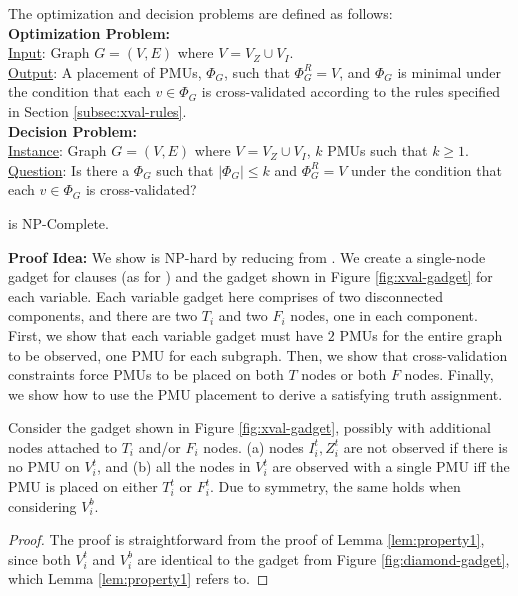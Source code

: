 The \xval optimization and decision problems are defined as follows:
\\
{\bf \xval Optimization Problem:} \\
	\indent \underline{Input}: Graph $G=(V,E)$ where $V=V_Z \cup V_I$. \\
	\indent \underline{Output}: A placement of PMUs, $\Phi_G$, such that $\Phi^R_G = V$,
	and  $\Phi_G$ is minimal under the condition that each $v \in \Phi_G$ is cross-validated according to the rules specified in Section \ref{subsec:xval-rules}.
\\
{\bf \xval Decision Problem:} \\
	\indent \underline{Instance}: Graph $G=(V,E)$ where $V=V_Z \cup V_I$, $k$ PMUs such that $k \geq 1$. \\
	\indent \underline{Question}: Is there a $\Phi_G$ such that $|\Phi_G| \leq k$ and $\Phi^R_G = V$ under the condition that each $v \in \Phi_G$ is cross-validated?



\begin{theorem}
\xval is NP-Complete. %
\label{thm:npc-xval}
\end{theorem}



{\bf Proof Idea:}   We show \xval is NP-hard by reducing from \sats.  
We create a single-node gadget for clauses (as for \fulls) and the gadget shown in Figure \ref{fig:xval-gadget} for each variable. Each variable gadget here comprises of two disconnected components, 
and there are two $T_i$ and two $F_i$ nodes, one in each component. First, we show that each variable gadget must have $2$ PMUs for the entire graph to be observed, one PMU for each subgraph.
Then, we show that cross-validation constraints force PMUs to be placed on both $T$ nodes or both $F$ nodes.  Finally, we show how to use the PMU placement to derive a satisfying \sat truth assignment.
 

\begin{lemma}\label{lem:property2}
Consider the gadget shown in Figure \ref{fig:xval-gadget}, possibly with additional nodes attached to $T_i$ and/or $F_i$ nodes. (a) nodes $I^t_i, Z^t_i$ are not observed if there is no PMU on $V_i^t$, and (b) all the nodes in $V_i^t$ are observed with a single PMU iff the PMU is placed on either $T_i^t$ or $F_i^t$. Due to symmetry, the same holds when considering $V_i^b$.
\end{lemma}
\begin{proof}
The proof is straightforward from the proof of Lemma \ref{lem:property1}, since both $V_i^t$ and $V_i^b$ are identical to the gadget from Figure \ref{fig:diamond-gadget},  which Lemma \ref{lem:property1} refers to. 
\end{proof}

